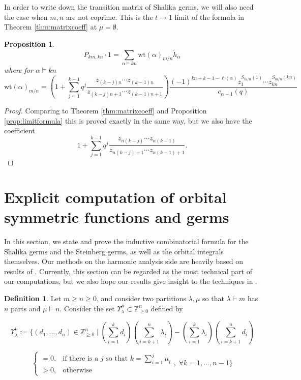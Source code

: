 \documentclass{amsart}
\numberwithin{equation}{section}
\newtheorem{proposition}[lemma]{Proposition}%
\theoremstyle{definition}
\newtheorem{definition}[lemma]{Definition}%
\def\tilde{\widetilde}
\renewcommand{\th}{\tilde{h}}
\newcommand{\wt}{\mathrm{wt}}
\newcommand{\Z}{{\mathbb Z}}
\begin{document}
In order to write down the transition matrix of Shalika germs, we will also need the case when $m,n$ are not coprime.
This is the $t\to 1$ limit of the formula in Theorem \ref{thm:matrixcoeff} at $\mu=\emptyset$. 
\begin{proposition}
\label{prop:limitformulafull}
\begin{equation}
\label{eq:noncoprimeformula}
P_{km,kn}\cdot 1=\sum_{\alpha\vDash kn} \wt(\alpha)_{m/n}\th_\alpha
\end{equation}
where for $\alpha\vDash kn$
\begin{equation}
\label{eq:compweightfull}
\wt(\alpha)_{m/n}=\left(1+\sum_{j=1}^{k-1} q^j \frac{z_{(k-j)n}\cdots z_{(k-1)n}}{z_{(k-j)n+1}\cdots z_{(k-1)n+1}}\right) \frac{(-1)^{kn+k-1-\ell(\alpha)}z_1^{S_{m/n}(1)}\cdots z_{kn}^{S_{m/n}(kn)}}{c_{\alpha-1}(q)}
\end{equation}
\end{proposition}
\begin{proof}
Comparing to Theorem \ref{thm:matrixcoeff} and Proposition \ref{prop:limitformula} this is proved exactly in the same way, but we also have the coefficient 
$$1+\sum_{j=1}^{k-1}q^j \frac{z_{n(k-j)}\cdots z_{n(k-1)}}{z_{n(k-j)+1}\cdots z_{n(k-1)+1}}.$$ 
\end{proof}


\section{Explicit computation of orbital symmetric functions and germs}
\label{sec:combinatorics}

In this section, we state and prove the inductive combinatorial formula for the Shalika germs and the Steinberg germs, as well as the orbital integrals themselves. Our methods on the harmonic analysis side are heavily based on results of \cite{W2}. Currently, this section can be regarded as the most technical part of our computations, but we also hope our results give insight to the techniques in \cite{W2}.

\begin{definition}
\label{def:gamma}
Let $m\geq n\geq 0$, and consider two partitions $\lambda, \mu$ so that $\lambda \vdash m$ has $n$ parts and $\mu\vdash n$. Consider the set $\Upsilon^\mu_\lambda\subset \Z_{\ge 0}^n$ defined by

$$\Upsilon^\mu_\lambda:=\Bigg\{(d_1,\ldots,d_n)\in\Z_{\ge 0}^n\;|\;(\sum_{i=1}^k d_i)(\sum_{i=k+1}^n\lambda_i)-(\sum_{i=1}^k\lambda_i)(\sum_{i=k+1}^nd_i)$$

$$\begin{cases}
=0, & \text{if there is a $j$ so that $k=\sum_{i=1}^j\mu_i$}\\
>0, & \text{otherwise}
\end{cases}, \; \forall k=1,\ldots, n-1 \Bigg\}
$$
\end{definition}
\end{document}
